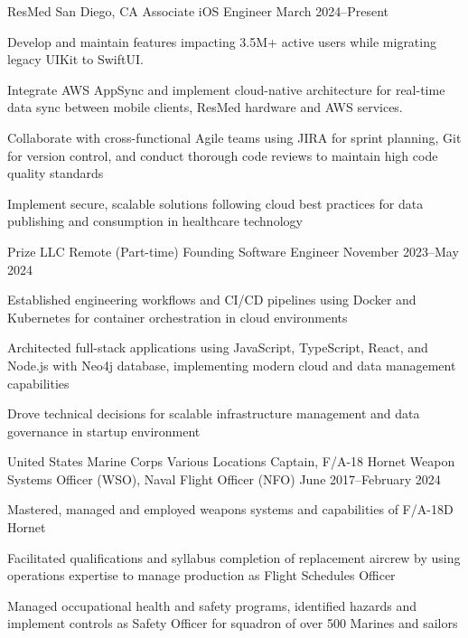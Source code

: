 \experienceentry
{ResMed}
{San Diego, CA}
{Associate iOS Engineer}
{March 2024--Present}
{
    \item Develop and maintain features impacting 3.5M+ active users while migrating legacy UIKit to SwiftUI.
    \item Integrate AWS AppSync and implement cloud-native architecture for real-time data sync between mobile clients, ResMed hardware and AWS services.
    \item Collaborate with cross-functional Agile teams using JIRA for sprint planning, Git for version control, and conduct thorough code reviews to maintain high code quality standards
    \item Implement secure, scalable solutions following cloud best practices for data publishing and consumption in healthcare technology
}

\experienceentry
{Prize LLC}
{Remote (Part-time)}
{Founding Software Engineer}
{November 2023--May 2024}
{
    \item Established engineering workflows and CI/CD pipelines using Docker and Kubernetes for container orchestration in cloud environments
    \item Architected full-stack applications using JavaScript, TypeScript, React, and Node.js with Neo4j database, implementing modern cloud and data management capabilities
    \item Drove technical decisions for scalable infrastructure management and data governance in startup environment
}

\experienceentry
{United States Marine Corps}
{Various Locations}
{Captain, F/A-18 Hornet Weapon Systems Officer (WSO), Naval Flight Officer (NFO)}
{June 2017--February 2024}
{
    \item Mastered, managed and employed weapons systems and capabilities of F/A-18D Hornet
    \item Facilitated qualifications and syllabus completion of replacement aircrew by using operations expertise to manage
    production as Flight Schedules Officer
    \item Managed occupational health and safety programs, identified hazards and implement controls as Safety Officer for
    squadron of over 500 Marines and sailors
}